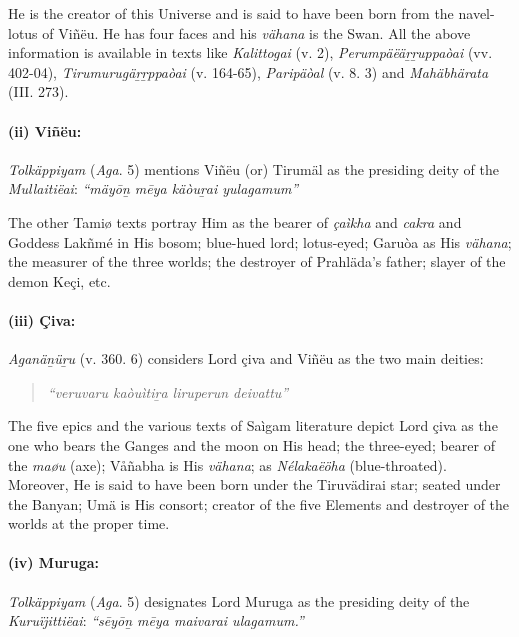He is the creator of this Universe and is said to have been born from the navel-lotus of Viñëu. He has four faces and his \textit{vähana} is the Swan. All the above information is available in texts like \textit{Kalittogai} (v. 2), \textit{Perumpäëäṟṟuppaòai} (vv. 402-04), \textit{Tirumurugäṟṟppaòai} (v. 164-65), \textit{Paripäòal} (v. 8. 3) and \textit{Mahäbhärata} (III. 273).


\paragraph*{(ii) Viñëu:}

\textit{Tolkäppiyam} (\textit{Aga}. 5) mentions Viñëu (or) Tirumäl as the presiding deity of the \textit{Mullaitiëai}: \textit{ “mäyōṉ mēya käòuṟai yulagamum”}

The other Tamiø texts portray Him as the bearer of \textit{çaìkha} and \textit{cakra} and Goddess Lakñmé in His bosom; blue-hued lord; lotus-eyed; Garuòa as His \textit{vähana}; the measurer of the three worlds; the destroyer of Prahläda’s father; slayer of the demon Keçi, etc.


\paragraph*{(iii) Çiva:}

\textit{Aganäṉüṟu} (v. 360. 6) considers Lord çiva and Viñëu as the two main deities:

\begin{verse}
\textit{“veruvaru kaòuìtiṟa liruperun deivattu”}
\end{verse}

The five epics and the various texts of Saìgam literature depict Lord çiva as the one who bears the Ganges and the moon on His head; the three-eyed; bearer of the \textit{maøu} (axe); Våñabha is His \textit{vähana}; as \textit{Nélakaëöha} (blue-throated). Moreover, He is said to have been born under the Tiruvädirai star; seated under the Banyan; Umä is His consort; creator of the five Elements and destroyer of the worlds at the proper time.


\paragraph*{(iv) Muruga:}

\textit{Tolkäppiyam} (\textit{Aga}. 5) designates Lord Muruga as the presiding deity of the \textit{Kuruïjittiëai}: \textit{“sēyōṉ mēya maivarai ulagamum.”}

